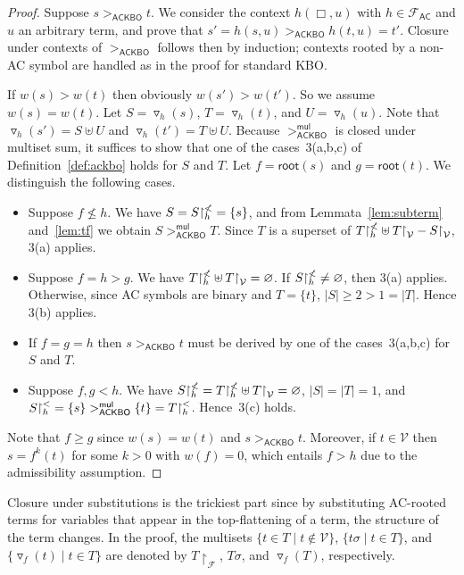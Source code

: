 \documentclass{tlp}
\newcommand{\tf}[1]{{\triangledown_{\!#1}}}
\newcommand{\m}[1]{\mathsf{#1}}
\newcommand{\mc}[1]{\mathcal{#1}}
\newcommand{\mr}[1]{\mathrm{#1}}
\newcommand{\rt}{\m{root}}
\newcommand{\mul}{\m{mul}}
\newcommand{\FF}{\mc{F}}
\newcommand{\VV}{\mc{V}}
\newcommand{\AC}{\mr{\m{AC}}}
\newcommand{\ackbo}{\mr{\m{ACKBO}}}
\newcommand{\rrs}[3][f]{{#2}{\restriction}^{\smash{#3}}_{#1}}
\begin{document}
\begin{proof}
Suppose $s >_\ackbo t$. We consider the context $h(\Box,u)$ with
$h \in \FF_\AC$ and $u$ an arbitrary term, and prove that
$s' = h(s,u) >_\ackbo h(t,u) = t'$. Closure under contexts of
$>_\ackbo$ follows
then by induction; contexts rooted by a non-AC symbol are handled as in
the proof for standard KBO.

If $w(s) > w(t)$ then obviously $w(s') > w(t')$. So we assume $w(s) =
w(t)$. Let $S = \tf{h}(s)$, $T = \tf{h}(t)$, and $U = \tf{h}(u)$.  Note
that $\tf{h}(s') = S \uplus U$ and $\tf{h}(t') = T \uplus U$.  
Because $>_\ackbo^\mul$ is closed under multiset sum, it suffices
to show that one of the cases~3(a,b,c) of
Definition~\ref{def:ackbo} holds for $S$ and $T$. Let $f = \rt(s)$ and
$g = \rt(t)$. We distinguish the following cases.
\begin{itemize}
\item
Suppose $f \nleqslant h$. We have
$S = \rrs[h]{S}{\nless} = \{ s \}$,
and from Lemmata~\ref{lem:subterm} and~\ref{lem:tf} we obtain
$S >_\ackbo^\mul T$. Since $T$ is a superset of
$\rrs[h]{T}{\nless} \uplus T{\restriction}_\VV - S{\restriction}_\VV$,
3(a) applies.
\item\smallskip
Suppose $f = h > g$. We have
$\rrs[h]{T}{\nless} \uplus T{\restriction}_\VV = \varnothing$.
If $\rrs[h]{S}{\nless} \neq \varnothing$, then
3(a) applies. Otherwise,
since AC symbols are binary and $T = \{ t \}$,
$|S| \geqslant 2 > 1 = |T|$. Hence 3(b) applies.
\item\smallskip
If $f = g = h$ then $s >_\ackbo t$ must be derived by one of the
cases~3(a,b,c) for $S$ and $T$.
\item\smallskip
Suppose $f, g < h$. We have 
$\rrs[h]{S}{\nless} = \rrs[h]{T}{\nless} \uplus T{\restriction}_\VV =
\varnothing$, $|S| = |T| = 1$, and
$\rrs[h]{S}{<} = \{ s \} >_\ackbo^\mul \{ t \} = \rrs[h]{T}{<}$.
Hence~3(c) holds.
\end{itemize}
Note that $f \geqslant g$ since $w(s) = w(t)$ and $s >_\ackbo t$.
Moreover, if $t \in \VV$ then $s = f^k(t)$ for some $k > 0$ with
$w(f) = 0$, which entails $f > h$ due to
the admissibility assumption.
\end{proof}

Closure under substitutions is the trickiest part since
by substituting AC-rooted terms for variables that appear in the
top\hyp flattening of a term, the structure of the term changes.
In the proof, the multisets $\{ t \in T \mid t \notin \VV \}$,
$\{ t\sigma \mid t \in T \}$, and $\{ \tf{f}(t) \mid t \in T \}$ are
denoted by $T{\restriction}_\FF$, $T\sigma$, and $\tf{f}(T)$,
respectively.
\end{document}
